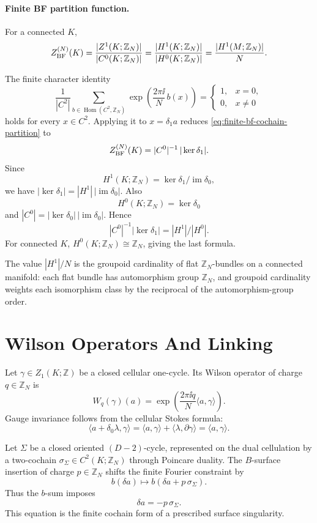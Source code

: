 \paragraph{Finite BF partition function.}
For a connected \(K\),
\[
  Z_{\rm BF}^{(N)}(K)
  =
  \frac{|Z^1(K;\mathbb Z_N)|}{|C^0(K;\mathbb Z_N)|}
  =
  \frac{|H^1(K;\mathbb Z_N)|}{|H^0(K;\mathbb Z_N)|}
  =
  \frac{|H^1(M;\mathbb Z_N)|}{N}.
\]

The finite character identity
\[
  \frac{1}{|C^2|}
  \sum_{b\in\operatorname{Hom}(C^2,\mathbb Z_N)}
  \exp\!\left(\frac{2\pi\ii}{N}\,b(x)\right)
  =
  \begin{cases}
  1,&x=0,\\
  0,&x\ne0
  \end{cases}
\]
holds for every \(x\in C^2\).  Applying it to \(x=\delta_1a\) reduces
\eqref{eq:finite-bf-cochain-partition} to
\[
  Z_{\rm BF}^{(N)}(K)=|C^0|^{-1}\,|\ker\delta_1|.
\]
Since
\[
  H^1(K;\mathbb Z_N)=\ker\delta_1/\operatorname{im}\delta_0,
\]
we have \(|\ker\delta_1|=|H^1|\,|\operatorname{im}\delta_0|\).  Also
\[
  H^0(K;\mathbb Z_N)=\ker\delta_0
\]
and \(|C^0|=|\ker\delta_0|\,|\operatorname{im}\delta_0|\).  Hence
\[
  |C^0|^{-1}|\ker\delta_1|
  =
  |H^1|/|H^0|.
\]
For connected \(K\), \(H^0(K;\mathbb Z_N)\cong\mathbb Z_N\), giving the last
formula.

The value \(|H^1|/N\) is the groupoid cardinality of flat
\(\mathbb Z_N\)-bundles on a connected manifold: each flat bundle has
automorphism group \(\mathbb Z_N\), and groupoid cardinality weights each
isomorphism class by the reciprocal of the automorphism-group order.

\section{Wilson Operators And Linking}

Let \(\gamma\in Z_1(K;\mathbb Z)\) be a closed cellular one-cycle.  Its
Wilson operator of charge \(q\in\mathbb Z_N\) is
\[
  W_q(\gamma)(a)
  =
  \exp\!\left(\frac{2\pi\ii q}{N}\langle a,\gamma\rangle\right).
\]
Gauge invariance follows from the cellular Stokes formula:
\[
  \langle a+\delta_0\lambda,\gamma\rangle
  =
  \langle a,\gamma\rangle+\langle\lambda,\partial\gamma\rangle
  =
  \langle a,\gamma\rangle .
\]

Let \(\Sigma\) be a closed oriented \((D-2)\)-cycle, represented on the dual
cellulation by a two-cochain \(\sigma_\Sigma\in C^2(K;\mathbb Z_N)\) through
Poincare duality.  The \(B\)-surface insertion of charge \(p\in\mathbb Z_N\)
shifts the finite Fourier constraint by
\[
  b(\delta a)
  \longmapsto
  b(\delta a+p\,\sigma_\Sigma).
\]
Thus the \(b\)-sum imposes
\[
  \delta a=-p\,\sigma_\Sigma .
\]
This equation is the finite cochain form of a prescribed surface singularity.

